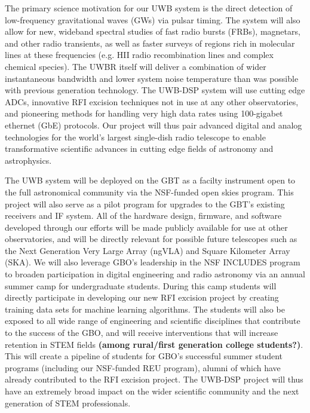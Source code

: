 \documentclass[10pt]{NSF}
\begin{document}
The primary science motivation for our UWB system is the direct
detection of low-frequency gravitational waves (GWs) via pulsar
timing.  The system will also allow for new, wideband spectral studies
of fast radio bursts (FRBs), magnetars, and other radio transients, as
well as faster surveys of regions rich in molecular lines at these
frequencies (e.g. HII radio recombination lines and complex chemical
species).  The UWBR itself will deliver a combination of wider
instantaneous bandwidth and lower system noise temperature than was
possible with previous generation technology.  The UWB-DSP system will
use cutting edge ADCs, innovative RFI excision techniques not in use
at any other observatories, and pioneering methods for handling very
high data rates using 100-gigabet ethernet (GbE) protocols.  Our
project will thus pair advanced digital and analog technologies for
the world's largest single-dish radio telescope to enable
transformative scientific advances in cutting edge fields of astronomy
and astrophysics.

The UWB system will be deployed on the GBT as a facilty instrument
open to the full astronomical community via the NSF-funded open skies
program.  This project will also serve as a pilot program for upgrades
to the GBT's existing receivers and IF system.  All of the hardware
design, firmware, and software developed through our efforts will be
made publicly available for use at other observatories, and will be
directly relevant for possible future telescopes such as the Next
Generation Very Large Array (ngVLA) and Square Kilometer Array (SKA).
We will also leverage GBO's leadership in the NSF INCLUDES program to
broaden participation in digital engineering and radio astronomy via
an annual summer camp for undergraduate students.  During this camp
students will directly participate in developing our new RFI excision
project by creating training data sets for machine learning
algorithms.  The students will also be exposed to all wide range of
engineering and scientific disciplines that contribute to the success
of the GBO, and will receive interventions that will increase
retention in STEM fields \textbf{(among rural/first generation college
  students?)}.  This will create a pipeline of students for GBO's
successful summer student programs (including our NSF-funded REU
program), alumni of which have already contributed to the RFI excision
project.  The UWB-DSP project will thus have an extremely broad impact
on the wider scientific community and the next generation of STEM
professionals.
\end{document}
